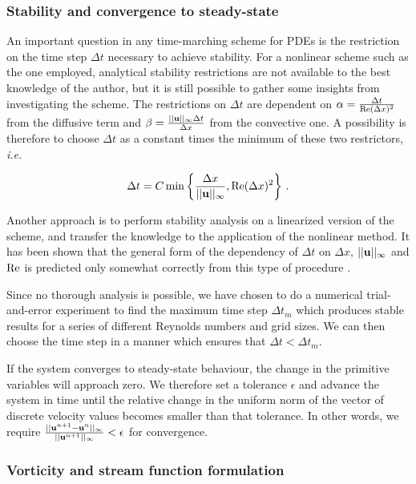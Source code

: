 \documentclass[final,3p,twocolumn]{elsarticle}
\begin{document}
\subsubsection{Stability and convergence to steady-state}

An important question in any time-marching scheme for PDEs is the restriction
on the time step $\Delta t$ necessary to achieve stability. For a nonlinear
scheme such as the one employed, analytical stability restrictions are not
available to the best knowledge of the author, but it is still possible to
gather some insights from investigating the scheme. The restrictions on $\Delta
t$ are dependent on $\alpha = \frac{\Delta t}{{\rm Re} (\Delta x)^2}$ from the
diffusive term and $\beta = \frac{||{\bf u}||_{\infty} \Delta t}{\Delta x}$
from the convective one. A possibility is therefore to choose $\Delta t$ as a
constant times the minimum of these two restrictors, {\em i.e.\ } 

\begin{equation}
    \Delta t = C \min \left\{ \frac{\Delta x}{||{\bf u}||_{\infty}}, {\rm Re} (\Delta x)^2
    \right\} \,.
    \label{eq:timeStep}
\end{equation}
 
Another approach is to perform stability analysis on a linearized version of
the scheme, and transfer the knowledge to the application of the nonlinear
method. It has been shown that the general form of the dependency of $\Delta t$
on $\Delta x$, $||{\bf u}||_{\infty}$ and ${\rm Re}$ is predicted only somewhat
correctly from this type of procedure \cite{kress2006time}. 

Since no thorough analysis is possible, we have chosen to do a numerical
trial-and-error experiment to find the maximum time step $\Delta t_m$ which
produces stable results for a series of different Reynolds numbers and grid
sizes. We can then choose the time step in a manner which ensures that $\Delta
t < \Delta t_m$. 

If the system converges to steady-state behaviour, the change in the primitive
variables will approach zero. We therefore set a tolerance $\epsilon$ and
advance the system in time until the relative change in the uniform norm of the
vector of discrete velocity values becomes smaller than that tolerance.  In
other words, we require $\frac{||{\bf u}^{n+1} - {\bf u}^{n}||_{\infty}}{
||{\bf u}^{n+1}||_{\infty}} < \epsilon$ for convergence. 

\subsubsection{Vorticity and stream function formulation}
\end{document}
